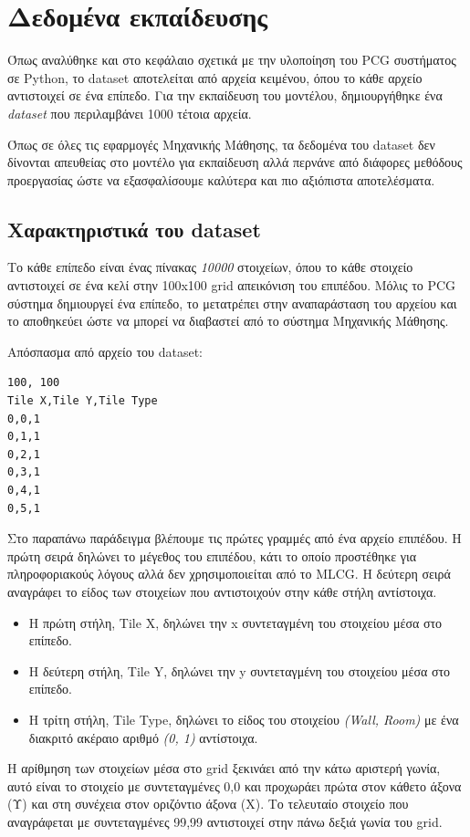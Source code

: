 \section{Δεδομένα εκπαίδευσης}
Όπως αναλύθηκε και στο κεφάλαιο σχετικά με την υλοποίηση του PCG συστήματος σε Python, το dataset αποτελείται από αρχεία κειμένου, όπου το κάθε αρχείο αντιστοιχεί σε ένα επίπεδο. Για την εκπαίδευση του μοντέλου, δημιουργήθηκε ένα \textit{dataset} που περιλαμβάνει 1000 τέτοια αρχεία.
\par
Όπως σε όλες τις εφαρμογές Μηχανικής Μάθησης, τα δεδομένα του dataset δεν δίνονται απευθείας στο μοντέλο για εκπαίδευση αλλά περνάνε από διάφορες μεθόδους προεργασίας ώστε να εξασφαλίσουμε καλύτερα και πιο αξιόπιστα αποτελέσματα.


\subsection{Χαρακτηριστικά του dataset}
Το κάθε επίπεδο είναι ένας πίνακας \textit{10000} στοιχείων, όπου το κάθε στοιχείο αντιστοιχεί σε ένα κελί στην 100x100 grid απεικόνιση του επιπέδου. Μόλις το PCG σύστημα δημιουργεί ένα επίπεδο, το μετατρέπει στην αναπαράσταση του αρχείου και το αποθηκεύει ώστε να μπορεί να διαβαστεί από το σύστημα Μηχανικής Μάθησης.
\par
Απόσπασμα από αρχείο του dataset:
\begin{verbatim}
100, 100
Tile X,Tile Y,Tile Type
0,0,1
0,1,1
0,2,1
0,3,1
0,4,1
0,5,1
\end{verbatim}
Στο παραπάνω παράδειγμα βλέπουμε τις πρώτες γραμμές από ένα αρχείο επιπέδου. Η πρώτη σειρά δηλώνει το μέγεθος του επιπέδου, κάτι το οποίο προστέθηκε για πληροφοριακούς λόγους αλλά δεν χρησιμοποιείται από το MLCG. Η δεύτερη σειρά αναγράφει το είδος των στοιχείων που αντιστοιχούν στην κάθε στήλη αντίστοιχα.
\par

\begin{itemize}
\item Η πρώτη στήλη, Tile X, δηλώνει την x συντεταγμένη του στοιχείου μέσα στο επίπεδο.
\item Η δεύτερη στήλη, Tile Y, δηλώνει την y συντεταγμένη του στοιχείου μέσα στο επίπεδο.
\item Η τρίτη στήλη, Tile Type, δηλώνει το είδος του στοιχείου \textit{(Wall, Room)} με ένα διακριτό ακέραιο αριθμό \textit{(0, 1)} αντίστοιχα.
\end{itemize}

\par
H αρίθμηση των στοιχείων μέσα στο grid ξεκινάει από την κάτω αριστερή γωνία, αυτό είναι το στοιχείο με συντεταγμένες 0,0 και προχωράει πρώτα στον κάθετο άξονα (Υ) και στη συνέχεια στον οριζόντιο άξονα (Χ). Το τελευταίο στοιχείο που αναγράφεται με συντεταγμένες 99,99 αντιστοιχεί στην πάνω δεξιά γωνία του grid.


